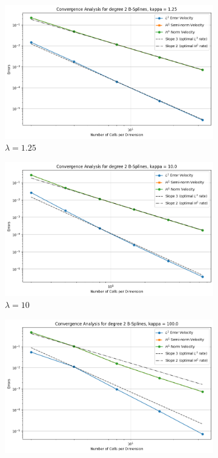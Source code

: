 \documentclass[a4paper,12pt,twoside]{report}
\begin{document}
\begin{figure}[!h]
	\centering
	\begin{subfigure}[b]{0.49\textwidth}
		\centering
		\includegraphics[width=\textwidth]{convergence_degree_2_non_mixed_kappa=1.25}
		\caption{$\lambda=1.25$}
	\end{subfigure}
	\begin{subfigure}[b]{0.49\textwidth}
		\centering
		\includegraphics[width=\textwidth]{convergence_degree_2_non_mixed_kappa=10.0}
		\caption{$\lambda=10$}
	\end{subfigure}
	\centering
	\begin{subfigure}[b]{0.49\textwidth}
		\centering
		\includegraphics[width=\textwidth]{convergence_degree_2_non_mixed_kappa=100.0}

\end{subfigure}
\end{figure}
\end{document}
